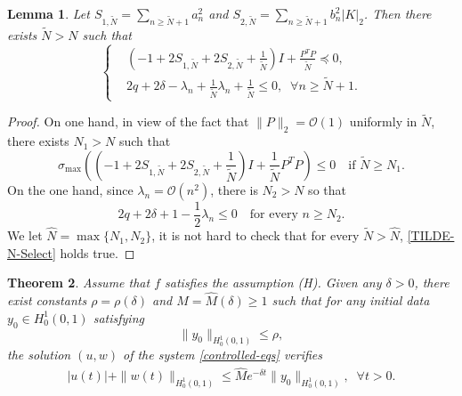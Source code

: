 \documentclass[review]{elsarticle}
\newtheorem{theorem}{Theorem}[section]
\newtheorem{lemma}[theorem]{Lemma}
\numberwithin{equation}{section}
\begin{document}
\begin{lemma}\label{Tilde-N-Select}
    Let $S_{1,\tilde{N}}=\sum\limits_{n\ge \tilde{N}+1}a_n^2$ and $S_{2,\tilde{N}}=\sum\limits_{n\ge \tilde{N}+1}b_n^2|K|_2$. Then there exists $\tilde{N}>N$ such that 
\begin{equation}
\label{TILDE-N-Select}
\left\{\begin{aligned}
    &(-1+ 2S_{1,\tilde{N}}+2S_{2,\tilde{N}}+\frac{1}{\tilde{N}}) I +\frac{P^TP}{\tilde{N}}\preceq 0,\\[2mm]
   & 2q+2\delta-\lambda_n+\frac{1}{\tilde{N}}\lambda_n+\frac{1}{\tilde{N}}\le 0,\;\;\forall n\ge \tilde{N}+1.
    \end{aligned}\right.
\end{equation}
\end{lemma}
\begin{proof}
    \noindent On one hand,
in view of the fact that $\|P\|_2= \mathcal{O}(1)$ uniformly in $\tilde{N}$, there exists $N_1> N$ such that 
\begin{equation*}
    \sigma_{\max} ((-1+ {2}S_{1,\tilde{N}}+{2}S_{2,\tilde{N}}+\frac{1}{\tilde{N}}) I +\frac{1}{\tilde{N}}P^TP)\le 0 \quad \text{if $\tilde{N}\ge N_1 $}.
\end{equation*}
On the one hand, since $\lambda_n=\mathcal{O}(n^2)$, there is $N_2> N$ so that
\begin{equation*}
    2q+2\delta+1-\frac{1}{2}\lambda_n\le 0\quad \text{for every }n\ge N_2.
\end{equation*}
We let $\hat{N}=\max\{N_1,N_2\}$, it is not hard to check that for every $\tilde{N}>\hat{N}$, \eqref{TILDE-N-Select} holds true.
\end{proof}
\begin{theorem}
\label{th2}
   Assume that $f$ satisfies the assumption (H). Given any $\delta>0$, there exist constants $\rho=\rho\left(\delta\right)$ and $\hat{M}=\hat{M}\left(\delta\right)\ge 1$ such that for any initial data $y_0\in H^1_0(0,1)$ satisfying $$\| y_0\|_{ H^1_0(0,1)}\le \rho,$$
the solution $(u,w)$ of the system \eqref{controlled-eqs} verifies 
\begin{equation}
    \label{ex-sta33}
    \begin{aligned}
               |u(t)|+ \|w(t)\|_{H^1_0(0,1)}\le \hat{M}e^{-\delta t}\|y_0\|_{H^1_0(0,1)},\;\;\forall t>0.
    \end{aligned}
\end{equation}
\end{theorem}
\end{document}
